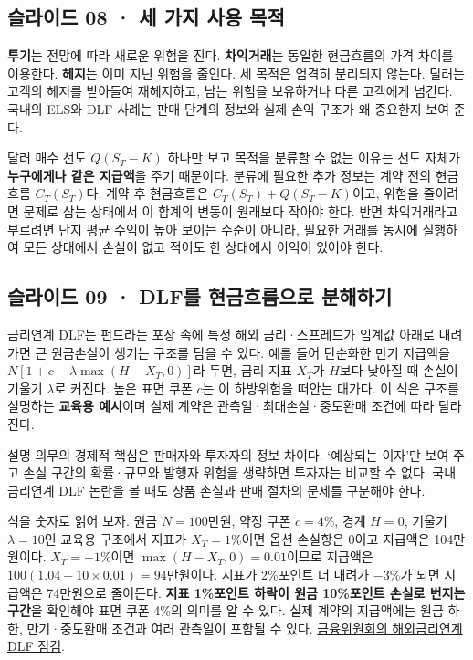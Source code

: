 \documentclass[11pt,a4paper]{article}
\begin{document}
\subsection{슬라이드 08 · 세 가지 사용 목적}
\textbf{투기}는 전망에 따라 새로운 위험을 진다. \textbf{차익거래}는 동일한 현금흐름의 가격 차이를 이용한다. \textbf{헤지}는 이미 지닌 위험을 줄인다. 세 목적은 엄격히 분리되지 않는다. 딜러는 고객의 헤지를 받아들여 재헤지하고, 남는 위험을 보유하거나 다른 고객에게 넘긴다. 국내의 ELS와 DLF 사례는 판매 단계의 정보와 실제 손익 구조가 왜 중요한지 보여 준다.\par

달러 매수 선도 $Q(S_T-K)$ 하나만 보고 목적을 분류할 수 없는 이유는 선도 자체가 \textbf{누구에게나 같은 지급액}을 주기 때문이다. 분류에 필요한 추가 정보는 계약 전의 현금흐름 $C_T(S_T)$다. 계약 후 현금흐름은 $C_T(S_T)+Q(S_T-K)$이고, 위험을 줄이려면 문제로 삼는 상태에서 이 합계의 변동이 원래보다 작아야 한다. 반면 차익거래라고 부르려면 단지 평균 수익이 높아 보이는 수준이 아니라, 필요한 거래를 동시에 실행하여 모든 상태에서 손실이 없고 적어도 한 상태에서 이익이 있어야 한다.\par

\subsection{슬라이드 09 · DLF를 현금흐름으로 분해하기}
금리연계 DLF는 펀드라는 포장 속에 특정 해외 금리·스프레드가 임계값 아래로 내려가면 큰 원금손실이 생기는 구조를 담을 수 있다. 예를 들어 단순화한 만기 지급액을 $N[1+c-\lambda\max(H-X_T,0)]$라 두면, 금리 지표 $X_T$가 $H$보다 낮아질 때 손실이 기울기 $\lambda$로 커진다. 높은 표면 쿠폰 $c$는 이 하방위험을 떠안는 대가다. 이 식은 구조를 설명하는 \textbf{교육용 예시}이며 실제 계약은 관측일·최대손실·중도환매 조건에 따라 달라진다.\par

설명 의무의 경제적 핵심은 판매자와 투자자의 정보 차이다. ‘예상되는 이자’만 보여 주고 손실 구간의 확률·규모와 발행자 위험을 생략하면 투자자는 비교할 수 없다. 국내 금리연계 DLF 논란을 볼 때도 상품 손실과 판매 절차의 문제를 구분해야 한다.\par

식을 숫자로 읽어 보자. 원금 $N=100$만원, 약정 쿠폰 $c=4\%$, 경계 $H=0$, 기울기 $\lambda=10$인 교육용 구조에서 지표가 $X_T=1\%$이면 옵션 손실항은 0이고 지급액은 104만원이다. $X_T=-1\%$이면 $\max(H-X_T,0)=0.01$이므로 지급액은 $100(1.04-10\times0.01)=94$만원이다. 지표가 2\%포인트 더 내려가 $-3\%$가 되면 지급액은 74만원으로 줄어든다. \textbf{지표 1\%포인트 하락이 원금 10\%포인트 손실로 번지는 구간}을 확인해야 표면 쿠폰 4\%의 의미를 알 수 있다. 실제 계약의 지급액에는 원금 하한, 만기·중도환매 조건과 여러 관측일이 포함될 수 있다. \href{https://www.fsc.go.kr/no010101/73971}{금융위원회의 해외금리연계 DLF 점검}.\par
\end{document}
